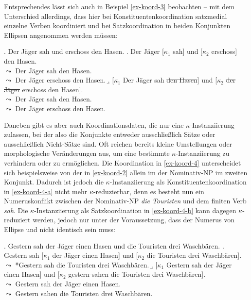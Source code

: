 Entsprechendes lässt sich auch in Beispiel \ref{ex-koord-3} beobachten -- mit dem Unterschied allerdings, dass hier bei Konstituentenkoordination satzmedial einzelne Verben koordiniert und bei Satzkoordination in beiden Konjunkten Ellipsen angenommen werden müssen:

\ex. \label{ex-koord-3} Der Jäger sah und erschoss den Hasen.
\a. \label{ex-koord-3-a} Der Jäger [$\kappa_1$ sah] und [$\kappa_2$ erschoss] den Hasen. \\
$\leadsto$ Der Jäger sah den Hasen. \\
$\leadsto$ Der Jäger erschoss den Hasen. 
\b. \label{ex-koord-3-b} [$\kappa_1$ Der Jäger sah \sout{den Hasen}] und [$\kappa_2$ \sout{der Jäger} erschoss den Hasen]. \\
$\leadsto$ Der Jäger sah den Hasen. \\
$\leadsto$ Der Jäger erschoss den Hasen. 


Daneben gibt es aber auch Koordinationsdaten, die nur eine $\kappa$-Instanziierung zulassen, bei der also die Konjunkte entweder aus\-schlie\ss lich Sätze oder aus\-schlie\ss lich Nicht-Sätze sind. Oft reichen bereits kleine Umstellungen oder morphologische Veränderungen aus, um eine bestimmte $\kappa$-Instanziierung zu verhindern oder zu ermöglichen. Die Koordination in \ref{ex-koord-4} unterscheidet sich beispielsweise von der in \ref{ex-koord-2} allein im  der Nominativ-NP im zweiten Konjunkt. Dadurch ist jedoch die $\kappa$-Instanziierung als Konstituentenkoordination in \ref{ex-koord-4-a} nicht mehr $\kappa$-reduzierbar, denn es besteht nun ein Numeruskonflikt zwischen der Nominativ-NP  {\it die Touristen} und dem finiten Verb {\it sah}. Die $\kappa$-Instanziierung als Satzkoordination in \ref{ex-koord-4-b} kann dagegen $\kappa$-reduziert werden, jedoch nur unter der Voraussetzung, dass der Numerus von Ellipse und  nicht identisch sein muss:    

\ex. \label{ex-koord-4} Gestern sah der Jäger einen Hasen und die Touristen drei Waschbären.
\a. \label{ex-koord-4-a} Gestern sah [$\kappa_1$ der Jäger einen Hasen] und [$\kappa_2$ die Touristen drei Waschbären]. \\
$\leadsto$ *Gestern sah die Touristen drei Waschbären.
\b. \label{ex-koord-4-b} [$\kappa_1$ Gestern sah der Jäger einen Hasen] und [$\kappa_2$ \sout{gestern sahen} die Touristen drei Waschbären]. \\
$\leadsto$ Gestern sah der Jäger einen Hasen. \\
$\leadsto$ Gestern sahen die Touristen drei Waschbären.

